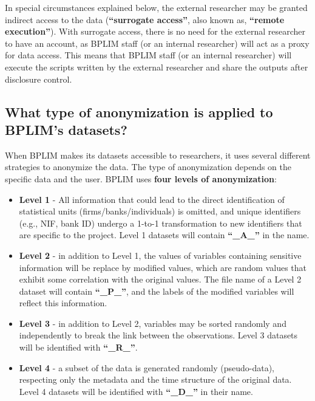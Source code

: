 \documentclass[
  a4paper,
  DIV=11,
  numbers=noendperiod]{scrartcl}
\begin{document}
In special circumstances explained below, the external researcher may be
granted indirect access to the data (\textbf{``surrogate access''}, also
known as, \textbf{``remote execution''}). With surrogate access, there
is no need for the external researcher to have an account, as BPLIM
staff (or an internal researcher) will act as a proxy for data access.
This means that BPLIM staff (or an internal researcher) will execute the
scripts written by the external researcher and share the outputs after
disclosure control.

\hypertarget{what-type-of-anonymization-is-applied-to-bplims-datasets}{%
\subsection{What type of anonymization is applied to BPLIM's
datasets?}\label{what-type-of-anonymization-is-applied-to-bplims-datasets}}

When BPLIM makes its datasets accessible to researchers, it uses several
different strategies to anonymize the data. The type of anonymization
depends on the specific data and the user. BPLIM uses \textbf{four
levels of anonymization}:

\begin{itemize}
\item
  \textbf{Level 1} - All information that could lead to the direct
  identification of statistical units (firms/banks/individuals) is
  omitted, and unique identifiers (e.g., NIF, bank ID) undergo a 1-to-1
  transformation to new identifiers that are specific to the project.
  Level 1 datasets will contain \textbf{``\_A\_''} in the name.
\item
  \textbf{Level 2} - in addition to Level 1, the values of variables
  containing sensitive information will be replace by modified values,
  which are random values that exhibit some correlation with the
  original values. The file name of a Level 2 dataset will contain
  \textbf{``\_P\_''}, and the labels of the modified variables will
  reflect this information.
\item
  \textbf{Level 3} - in addition to Level 2, variables may be sorted
  randomly and independently to break the link between the observations.
  Level 3 datasets will be identified with \textbf{``\_R\_''}.
\item
  \textbf{Level 4} - a subset of the data is generated randomly
  (pseudo-data), respecting only the metadata and the time structure of
  the original data. Level 4 datasets will be identified with
  \textbf{``\_D\_''} in their name.
\end{itemize}
\end{document}
